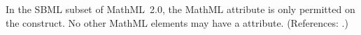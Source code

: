 In the SBML subset of MathML~2.0, the MathML attribute
 is only permitted on the  construct.
No other MathML elements may have a  attribute.
(References: .)

